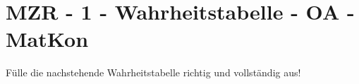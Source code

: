 \section{MZR - 1 - Wahrheitstabelle - OA - MatKon}

\begin{beispiel}[MZR]{1}
Fülle die nachstehende Wahrheitstabelle richtig und vollständig aus!
				
				\begin{center}
				\end{center}
\end{beispiel}
